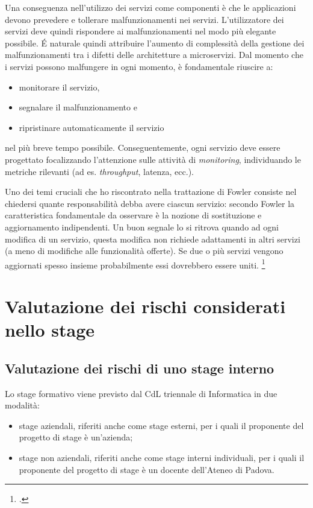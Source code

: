 Una conseguenza nell'utilizzo dei servizi come componenti è che le applicazioni devono prevedere e tollerare malfunzionamenti nei servizi. L'utilizzatore dei servizi deve quindi rispondere ai malfunzionamenti nel modo più elegante possibile.
É naturale quindi attribuire l'aumento di complessità della gestione dei malfunzionamenti tra i difetti delle architetture a microservizi.
Dal momento che i servizi possono malfungere in ogni momento, è fondamentale riuscire a:

\begin{itemize}
  \item monitorare il servizio,
  \item segnalare il malfunzionamento e
  \item ripristinare automaticamente il servizio
\end{itemize}
nel più breve tempo possibile. Conseguentemente, ogni servizio deve essere progettato focalizzando l'attenzione sulle attività di \emph{monitoring}, individuando le metriche rilevanti (ad es. \emph{throughput}, latenza, ecc.).

Uno dei temi cruciali che ho riscontrato nella trattazione di Fowler consiste nel chiedersi quante responsabilità debba avere ciascun servizio: secondo Fowler la caratteristica fondamentale da osservare è la nozione di sostituzione e aggiornamento indipendenti.
Un buon segnale lo si ritrova quando ad ogni modifica di un servizio, questa modifica non richiede adattamenti in altri servizi (a meno di modifiche alle funzionalità offerte).
Se due o più servizi vengono aggiornati spesso insieme probabilmente essi dovrebbero essere uniti.
\footcite{site:fowler-microservices}

\pagebreak
\section{Valutazione dei rischi considerati nello stage}

\subsection{Valutazione dei rischi di uno stage interno}

Lo stage formativo viene previsto dal CdL triennale di Informatica in due modalità:
\begin{itemize}
  \item stage aziendali, riferiti anche come stage esterni, per i quali il proponente del progetto di stage è un'azienda;
  \item stage non aziendali, riferiti anche come stage interni individuali, per i quali il proponente del progetto di stage è un docente dell'Ateneo di Padova.
\end{itemize}


